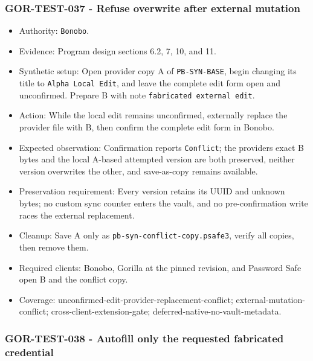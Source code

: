 \documentclass[
  letterpaper,
]{article}
\newcommand{\passthrough}[1]{#1}
\providecommand{\tightlist}{%
  \setlength{\itemsep}{0pt}\setlength{\parskip}{0pt}}
\begin{document}
\subsubsection{GOR-TEST-037 - Refuse overwrite after external
mutation}\label{gor-test-037---refuse-overwrite-after-external-mutation}

\begin{itemize}
\tightlist
\item
  Authority: \passthrough{\lstinline!Bonobo!}.
\item
  Evidence: Program design sections 6.2, 7, 10, and 11.
\item
  Synthetic setup: Open provider copy A of \nolinkurl{PB-SYN-BASE}, begin changing its title to
  \passthrough{\lstinline!Alpha Local Edit!}, and leave the complete edit form open and unconfirmed. Prepare B with note
  \passthrough{\lstinline!fabricated external edit!}.
\item
  Action: While the local edit remains unconfirmed, externally replace the provider file with B, then confirm the
  complete edit form in Bonobo.
\item
  Expected observation: Confirmation reports \passthrough{\lstinline!Conflict!}; the provider\textquotesingle s exact B
  bytes and the local A-based attempted version are both preserved, neither version overwrites the other, and
  save-as-copy remains available.
\item
  Preservation requirement: Every version retains its UUID and unknown bytes; no custom sync counter enters the vault,
  and no pre-confirmation write races the external replacement.
\item
  Cleanup: Save A only as \nolinkurl{pb-syn-conflict-copy.psafe3}, verify all copies, then remove them.
\item
  Required clients: Bonobo, Gorilla at the pinned revision, and Password Safe open B and the conflict copy.
\item
  Coverage: unconfirmed-edit-provider-replacement-conflict; external-mutation-conflict; cross-client-extension-gate;
  deferred-native-no-vault-metadata.
\end{itemize}

\subsubsection{GOR-TEST-038 - Autofill only the requested fabricated
credential}\label{gor-test-038---autofill-only-the-requested-fabricated-credential}
\end{document}
